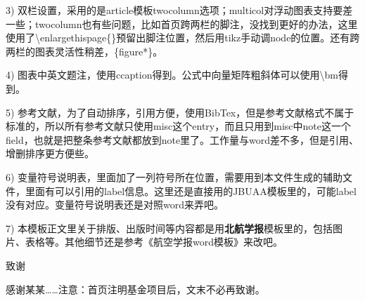 \documentclass[10.5pt,twocolumn]{aaas}
\newcommand\mycolorRed[1]{{\color{red}#1}}
\begin{document}
3) \mycolorRed{双栏}设置，采用的是article模板twocolumn选项；multicol对浮动图表支持要差一些；twocolumn也有些问题，比如首页跨两栏的脚注，没找到更好的办法，这里使用了\textbackslash enlargethispage\{\}预留出脚注位置，然后用tikz手动调node的位置。还有跨两栏的图表灵活性稍差，\{figure*\}。

4) 图表中英文题注，使用ccaption得到。公式中向量矩阵粗斜体可以使用\textbackslash bm得到。

5) 参考文献，为了自动排序，引用方便，使用BibTex，但是参考文献格式不属于标准的，所以所有参考文献只使用misc这个entry，而且只用到misc中note这一个field，也就是把整条参考文献都放到note里了。工作量与word差不多，但是引用、增删排序更方便些。

6) 变量符号说明表，里面加了一列符号所在位置，需要用到本文件生成的辅助文件，里面有可以引用的label信息。这里还是直接用的JBUAA模板里的，可能label没有对应。变量符号说明表还是对照word来弄吧。

7) \mycolorRed{本模板正文里关于排版、出版时间等内容都是用\textbf{北航学报}模板里的，包括图片、表格等。其他细节还是参考《航空学报word模板》来改吧。}

\vspace{1em}
{\noindent\xiaosihao 致\quad 谢}

\vspace{1em}
{\wuhao 
感谢某某……注意：首页注明基金项目后，文末不必再致谢。
}




\renewcommand\refname{\hei\wuhao\centerline{参\quad 考\quad 文\quad 献（20条以上）}\global\def\refname{参考文献}}
\vskip 12pt

\let\OLDthebibliography\thebibliography
\renewcommand\thebibliography[1]{
  \OLDthebibliography{#1}
  \setlength{\parskip}{0pt}
  \setlength{\itemsep}{0pt plus 0.3ex}
}

{
\renewcommand{\baselinestretch}{0.9}
\liuhao


}



% 
% 
% 
\end{document}

